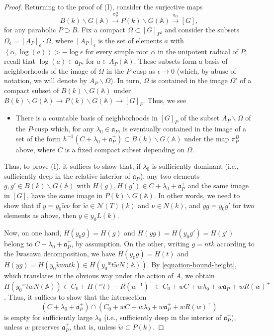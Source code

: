 \begin{proof}
Returning to the proof of (I), consider the surjective maps 
$$B(k)\backslash G(\mathbb A)\xrightarrow{\pi^B_P} P(k)\backslash G(\mathbb A) \xrightarrow{\pi_G} [G],$$ 
for any parabolic $P\supset B$. Fix a compact $\Omega\subset [G]_P$, and consider the subsets $\Omega_\epsilon= [A_P]_\epsilon \cdot \Omega$, where $[A_P]_{\epsilon}$ is the set of elements $a$ with $\left< \alpha,\log(a)\right> > -\log \epsilon$ for every simple root $\alpha$ in the unipotent radical of $P$; recall that $\log(a)\in\mathfrak a_P$, for $a\in A_P(\mathbb A)$. These subsets form a basis of neighborhoods of the image of $\Omega$ in the $P$-cusp as $\epsilon\to 0$ (which, by abuse of notation, we will denote by $A_P\backslash \Omega$). In turn, $\Omega$ is contained in the image $\Omega'$ of a compact subset of $B(k)\backslash G(\mathbb A)$ under $B(k)\backslash G(\mathbb A)\to P(k)\backslash G(\mathbb A) \to [G]_P$. Thus, we see
\begin{itemize}
 \item There is a countable basis of neighborhoods in $[G]_P$ of the subset $A_P\backslash \Omega$ of the $P$-cusp which, for any $\lambda_0\in \mathfrak a_P$, is eventually contained in  the image of a set of the form $h^{-1} (C+\lambda_0 + \mathfrak a_P^+)\subset B(k)\backslash G(\mathbb A)$ under the map $\pi^B_P$ above, where $C$ is a fixed compact subset depending on $\Omega$. 
\end{itemize}

Thus, to prove (I), it suffices to show that, if $\lambda_0$ is sufficiently dominant (i.e., sufficiently deep in the relative interior of $\mathfrak a_P^+$), any two elements $g, g'\in B(k)\backslash G(\mathbb A)$ with $H(g), H(g')\in C+\lambda_0 + \mathfrak a_P^+$ and the same image in $[G]$, have the same image in $P(k)\backslash G(\mathbb A)$. In other words, we need to show that if $y = y_0 \tilde w \nu$ for $\tilde w\in \mathcal N(T)(k)$ and $\nu\in N(k)$, and $y g = y_0 g'$ for two elements as above, then $y \in  y_0 L(k)$. 

Now, on one hand, $H(y_0g) = H(g)$ and $H(y g) = H(y_0 g') =  H(g')$ belong to $C+\lambda_0 + \mathfrak a_P^+$, by assumption. On the other, writing $g = n t k$ according to the Iwasawa decomposition, we have $H(y_0g) = H(t)$ and $H(yg) = H(y_0 \tilde w \nu ntk) \in H(y_0 {^wt} \tilde w N(\mathbb A))$. By \eqref{equation-bound-height}, which translates in the obvious way under the action of $A$, we obtain $H(y_0 {^wt} \tilde w N(\mathbb A)) \subset C_0 + H({^wt}) - R(w^{-1})^+ \subset C_0 + wC+ w\lambda_0 + w\mathfrak a_P^+ + w R(w)^+$. 
Thus, it suffices to show that the intersection
\begin{equation}
\label{equation-intersection-cones}
(C+\lambda_0 + \mathfrak a_P^+) \cap  (C_0 + wC+ w\lambda_0 + w\mathfrak a_P^+ +w R(w)^+)
\end{equation}
is empty for sufficiently large $\lambda_0$ (i.e., sufficiently deep in the interior of $\mathfrak a_P^+$), unless $w$ preserves $\mathfrak a_P^+$, that is, unless $\tilde w\subset P(k)$. 


\end{proof}
